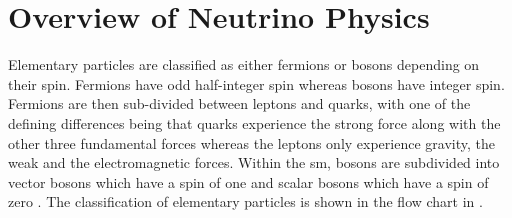 \section{Overview of Neutrino Physics}\label{sec:neutrino_physics}

Elementary particles are classified as either fermions or bosons depending on their spin. Fermions have odd half-integer spin whereas bosons have integer spin. Fermions are then sub-divided between leptons and quarks, with one of the defining differences being that quarks experience the strong force along with the other three fundamental forces whereas the leptons only experience gravity, the weak and the electromagnetic forces. Within the \gls{sm}, bosons are subdivided into vector bosons which have a spin of one and scalar bosons which have a spin of zero \cite{Particles_and_Fundamental_Interactions:_An_Introduction_to_Particle_Physics}. The classification of elementary particles is shown in the flow chart in .

